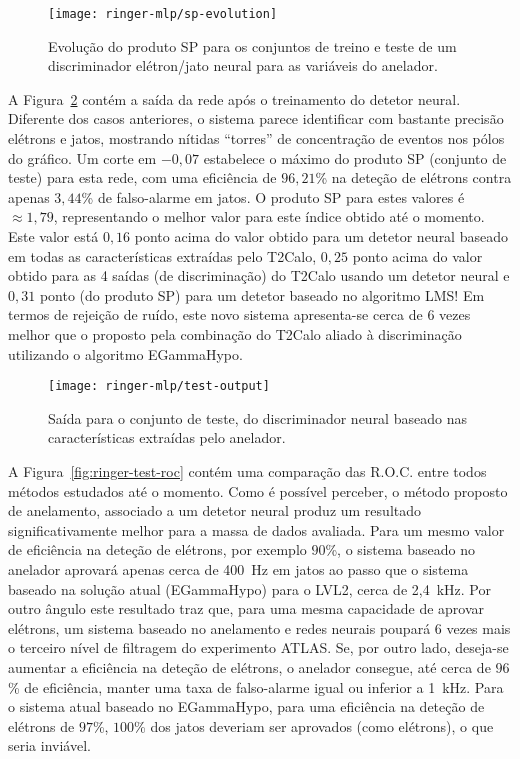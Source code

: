 \begin{figure}
\begin{center}
\texttt{[image: ringer-mlp/sp-evolution]}
\end{center}
\caption{Evolução do produto SP para os conjuntos de treino e teste de um
discriminador elétron/jato neural para as variáveis do anelador.}
\label{fig:ringer-mlp-sp}
\end{figure}

A Figura~\ref{fig:ringer-mlp-output} contém a saída da rede após o treinamento
do detetor neural. Diferente dos casos anteriores, o sistema parece
identificar com bastante precisão elétrons e jatos, mostrando nítidas
``torres'' de concentração de eventos nos pólos do gráfico. Um corte em
$-0,07$ estabelece o máximo do produto SP (conjunto de teste) para esta rede,
com uma eficiência de $96,21$\% na deteção de elétrons contra apenas $3,44$\%
de falso-alarme em jatos. O produto SP para estes valores é $\approx 1,79$,
representando o melhor valor para este índice obtido até o momento. Este valor
está $0,16$ ponto acima do valor obtido para um detetor neural baseado em
todas as características extraídas pelo T2Calo, $0,25$ ponto acima do valor
obtido para as 4 saídas (de discriminação) do T2Calo usando um detetor neural
e $0,31$ ponto (do produto SP) para um detetor baseado no algoritmo LMS! Em
termos de rejeição de ruído, este novo sistema apresenta-se cerca de 6 vezes
melhor que o proposto pela combinação do T2Calo aliado à discriminação
utilizando o algoritmo EGammaHypo.

\begin{figure}
\begin{center}
\texttt{[image: ringer-mlp/test-output]}
\end{center}
\caption{Saída para o conjunto de teste, do discriminador neural baseado nas
características extraídas pelo anelador.}
\label{fig:ringer-mlp-output}
\end{figure}

A Figura~\ref{fig:ringer-test-roc} contém uma comparação das R.O.C. entre
todos métodos estudados até o momento. Como é possível perceber, o método
proposto de anelamento, associado a um detetor neural produz um resultado
significativamente melhor para a massa de dados avaliada. Para um mesmo valor
de eficiência na deteção de elétrons, por exemplo $90$\%, o sistema baseado no
anelador aprovará apenas cerca de 400~Hz em jatos ao passo que o sistema
baseado na solução atual (EGammaHypo) para o LVL2, cerca de 2,4~kHz. Por outro
ângulo este resultado traz que, para uma mesma capacidade de aprovar elétrons,
um sistema baseado no anelamento e redes neurais poupará 6 vezes mais o
terceiro nível de filtragem do experimento ATLAS. Se, por outro lado,
deseja-se aumentar a eficiência na deteção de elétrons, o anelador consegue,
até cerca de $96$\% de eficiência, manter uma taxa de falso-alarme igual ou
inferior a 1~kHz. Para o sistema atual baseado no EGammaHypo, para uma
eficiência na deteção de elétrons de $97$\%, $100$\% dos jatos deveriam ser
aprovados (como elétrons), o que seria inviável.

